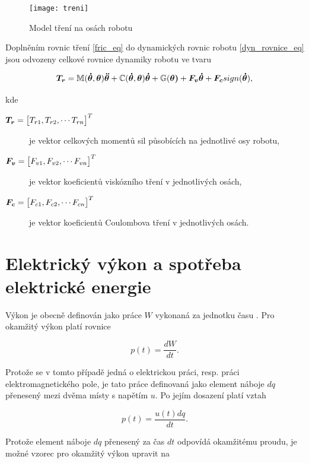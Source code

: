 \newpage
\begin{figure}[ht]
\texttt{[image: treni]}
\caption{Model tření na osách robotu}
\label{treni_pic}
\end{figure}

Doplněním rovnic tření \eqref{fric_eq} do dynamických rovnic robotu \eqref{dyn_rovnice_eq} jsou odvozeny celkové rovnice dynamiky robotu ve tvaru

\begin{equation}
\boldsymbol{T_r} = \mathbb{M}(\boldsymbol{\dot{\theta}},\boldsymbol{\theta})\boldsymbol{\ddot{\theta}} + \mathbb{C}(\boldsymbol{\dot{\theta}},\boldsymbol{\theta})\boldsymbol{\dot{\theta}} + \mathbb{G}(\boldsymbol{\theta)} + \boldsymbol{F_v}\boldsymbol{\dot{\theta}} + \boldsymbol{F_c}sign(\boldsymbol{\dot{\theta}}),
\label{celkova_dyn_rovnice_eq}
\end{equation}

kde

\begin{description}
\item[$\boldsymbol{T_r} = {\big[T_{r1}, T_{r2},  \dotsm  T_{rn}\big]}^{T}$] je vektor celkových momentů sil působících na jednotlivé osy robotu,
\item[$\boldsymbol{F_v} = {\big[F_{v1}, F_{v2},  \dotsm  F_{vn}\big]}^{T}$] je vektor koeficientů viskózního tření v jednotlivých osách,
\item[$\boldsymbol{F_c} = {\big[F_{c1}, F_{c2},  \dotsm  F_{cn}\big]}^{T}$] je vektor koeficientů Coulombova tření v jednotlivých osách.
\end{description}

\section{Elektrický výkon a spotřeba elektrické energie}
\label{el_vykon_ch}
Výkon je obecně definován jako práce $W$ vykonaná za jednotku času \cite{zemanek}. Pro okamžitý výkon platí rovnice

\begin{equation}
p(t) = \frac{dW}{dt}.
\end{equation}

Protože se v tomto případě jedná o elektrickou práci, resp. práci elektromagnetického pole, je tato práce definovaná jako element náboje $dq$ přenesený mezi dvěma místy s napětím $u$. Po jejím dosazení platí vztah

\begin{equation}
p(t) = \frac{u(t)dq}{dt}.
\end{equation}

Protože element náboje $dq$ přenesený za čas $dt$ odpovídá okamžitému proudu, je možné vzorec pro okamžitý výkon upravit na


